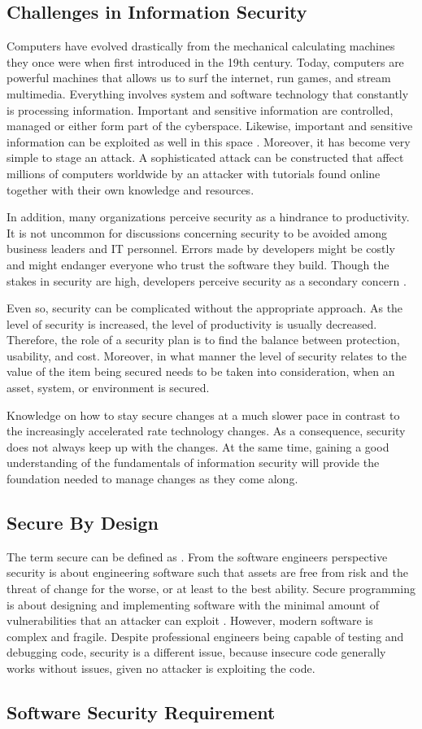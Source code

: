 \subsection{Challenges in Information Security}\label{sec:challenges-in-is}
Computers have evolved drastically from the mechanical calculating machines they once were when first introduced in the 19th century. Today, computers are powerful machines that allows us to surf the internet, run games, and stream multimedia. Everything involves system and software technology that constantly is processing information. Important and sensitive information are controlled, managed or either form part of the cyberspace. Likewise, important and sensitive information can be exploited as well in this space \cite{Li_2021}. Moreover, it has become very simple to stage an attack. A sophisticated attack can be constructed that affect millions of computers worldwide by an attacker with tutorials found online together with their own knowledge and resources. 

In addition, many organizations perceive security as a hindrance to productivity. It is not uncommon for discussions concerning security to be avoided  among business leaders and IT personnel. Errors made by developers might be costly and might endanger everyone who trust the software they build. Though the stakes in security are high, developers perceive security as a secondary concern \cite{Lopez_2019}. 

Even so, security can be complicated without the appropriate approach. As the level of security is increased, the level of productivity is usually decreased. Therefore, the role of a security plan is to find the balance between protection, usability, and cost. Moreover, in what manner the level of security relates to the value of the item being secured needs to be taken into consideration, when an asset, system, or environment is secured. 

Knowledge on how to stay secure changes at a much slower pace in contrast to the increasingly accelerated rate technology changes. As a consequence, security does not always keep up with the changes. At the same time, gaining a good understanding of the fundamentals of information security will provide the foundation needed to manage changes as they come along.

\subsection{Secure By Design}
The term secure can be defined as . From the software engineers perspective security is about engineering software such that assets are free from risk and the threat of change for the worse, or at least to the best ability. Secure programming is about designing and implementing software with the minimal amount of vulnerabilities that an attacker can exploit \cite{helfrich2019security}. However, modern software is complex and fragile. Despite professional engineers being capable of testing and debugging code, security is a different issue, because insecure code generally works without issues, given no attacker is exploiting the code.

\subsection{Software Security Requirement}
